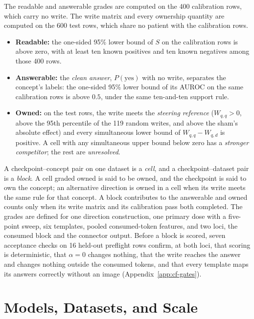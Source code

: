 \documentclass{article}
\begin{document}
The readable and answerable grades are computed on the 400 calibration rows, which carry no write. The write matrix and every ownership quantity are computed on the 600 test rows, which share no patient with the calibration rows.
\begin{itemize}[leftmargin=*,itemsep=1pt,topsep=2pt]
\item \textbf{Readable:} the one-sided 95\% lower bound of $S$ on the calibration rows is above zero, with at least ten known positives and ten known negatives among those 400 rows.
\item \textbf{Answerable:} the \emph{clean answer}, $P(\mathrm{yes})$ with no write, separates the concept's labels: the one-sided 95\% lower bound of its AUROC on the same calibration rows is above $0.5$, under the same ten-and-ten support rule.
\item \textbf{Owned:} on the test rows, the write meets the \emph{steering reference} ($W_{q,q}>0$, above the 95th percentile of the 119 random writes, and above the sham's absolute effect) and every simultaneous lower bound of $W_{q,q}-W_{q,d}$ is positive. A cell with any simultaneous upper bound below zero has a \emph{stronger competitor}; the rest are \emph{unresolved}.
\end{itemize}
A checkpoint--concept pair on one dataset is a \emph{cell}, and a checkpoint--dataset pair is a \emph{block}. A cell graded owned is said to be owned, and the checkpoint is said to own the concept; an alternative direction is owned in a cell when its write meets the same rule for that concept. A block contributes to the answerable and owned counts only when its write matrix and its calibration pass both completed. The grades are defined for one direction construction, one primary dose with a five-point sweep, six templates, pooled consumed-token features, and two loci, the consumed block and the connector output. Before a block is scored, seven acceptance checks on 16 held-out preflight rows confirm, at both loci, that scoring is deterministic, that $\alpha=0$ changes nothing, that the write reaches the answer and changes nothing outside the consumed tokens, and that every template maps its answers correctly without an image (Appendix~\ref{app:cf-gates}).
\label{sec:gates}

\section{Models, Datasets, and Scale}
\label{sec:setup}
\end{document}
